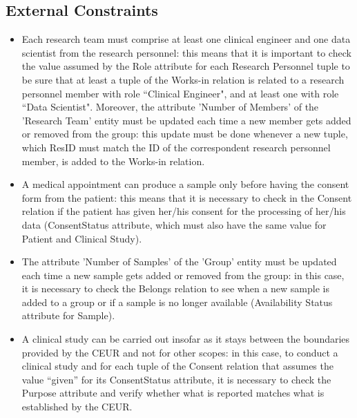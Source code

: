 \subsection{External Constraints}
\begin{itemize}
    \item Each research team must comprise at least one clinical engineer and one data scientist from the research personnel: this means that it is important to check the value assumed by the Role attribute for each Research Personnel tuple to be sure that at least a tuple of the Works-in relation is related to a research personnel member with role ``Clinical Engineer", and at least one with role ``Data Scientist".
    Moreover, the attribute 'Number of Members' of the 'Research Team' entity must be updated each time a new member gets added or removed from the group: this update must be done whenever a new tuple, which ResID must match the ID of the correspondent research personnel member, is added to the Works-in relation.
    \item A medical appointment can produce a sample only before having the consent form from the patient: this means that it is necessary to check in the Consent relation if the patient has given her/his consent for the processing of her/his data (ConsentStatus attribute, which must also have the same value for Patient and Clinical Study).
    \item The attribute 'Number of Samples' of the 'Group' entity must be updated each time a new sample gets added or removed from the group: in this case, it is necessary to check the Belongs relation to see when a new sample is added to a group or if a sample is no longer available (Availability Status attribute for Sample).
    \item A clinical study can be carried out insofar as it stays between the boundaries provided by the CEUR and not for other scopes: in this case, to conduct a clinical study and for each tuple of the Consent relation that assumes the value “given” for its ConsentStatus attribute, it is necessary to check the Purpose attribute and verify whether what is reported matches what is established by the CEUR.
\end{itemize}